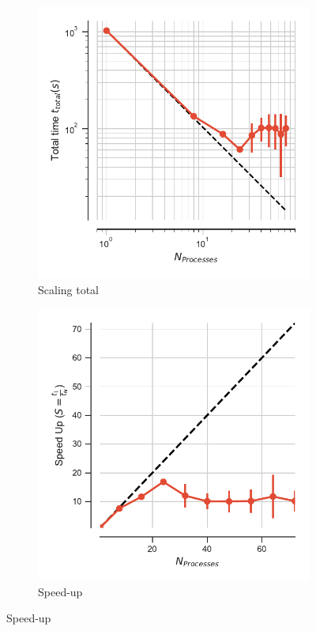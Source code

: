 \begin{figure}[ht!]
\centering
\begin{subfigure}{.4\textwidth}
  \includegraphics[width=\linewidth]{figures/main-RMSD-t_total.pdf}
  \caption{Scaling total}
  \label{fig:MPIscaling}
\end{subfigure}
\hfill
\begin{subfigure}{.4\textwidth}
  \includegraphics[width=\linewidth]{figures/main-RMSD-speed_up.pdf}
  \caption{Speed-up}
  \label{fig:MPIspeedup}
\end{subfigure}
\bigskip


\end{figure}
